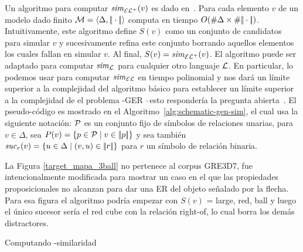 Un algoritmo para computar ${\it sim}_{{\mathcal{EL}^+}}(v)$ es dado en~\cite{HHK95}. Para cada
elemento $v$ de un modelo dado finito
$\mathcal{M}=\langle \Delta,|\!|\cdot|\!| \rangle$
computa en tiempo $O(\# \Delta\times\# {|\!|\cdot|\!|})$.
Intuitivamente, este algoritmo
define $S(v)$ como un conjunto de candidatos para simular $v$ y
sucesivamente refina este conjunto borrando aquellos elementos los cuales fallan en simular $v$.
Al final, $S(v)={\it sim}_{\mathcal{EL}^+}(v)$. El algoritmo puede ser adaptado para
computar ${\it sim}_{\mathcal{L}}$ para cualquier otro languaje $\mathcal{L}$. En particular,
lo podemos usar para computar ${\it sim}_\mathcal{EL}$ en tiempo polinomial y nos dar\'a un l\'imite superior a la
complejidad del algoritmo b\'asico para establecer un l\'imite superior a la complejidad de el problema \EL-GER 
--esto responder\'ia la pregunta abierta~\cite{areces08}. El pseudo-c\'odigo es mostrado en el
Algoritmo~\ref{alg:schematic-gen-sim}, el cual usa la siguiente
notaci\'on: $\mathcal{P}$ es un conjunto fijo de s\'imbolos de relaciones unarias, para $v\in
\Delta$, sea $P(v)=\{p\in\mathcal{P}\mid v\in|\!|p|\!|\}$ y sea tambi\'en
${\it suc}_{r}(v)=\{u\in\Delta\mid(v,u)\in|\!|r|\!|\}$ para $r$ un s\'imbolo de relaci\'on binaria.

La Figura \ref{target_mapa_3ball} no pertenece al corpus GRE3D7, fue intencionalmente modificada para mostrar un caso en el que las propiedades proposicionales no alcanzan para dar una ER del objeto se\~nalado por la flecha. Para esa figura el algoritmo podr\'ia empezar con $S(v)$ = large, red, ball y luego el \'unico sucesor ser\'ia el red cube con la relaci\'on right-of, lo cual borra los dem\'as distractores.




\begin{algorithm}
\small
\caption{ Computando \EL-similaridad\label{alg:schematic-gen-sim}}
 \BlankLine


\end{algorithm}


